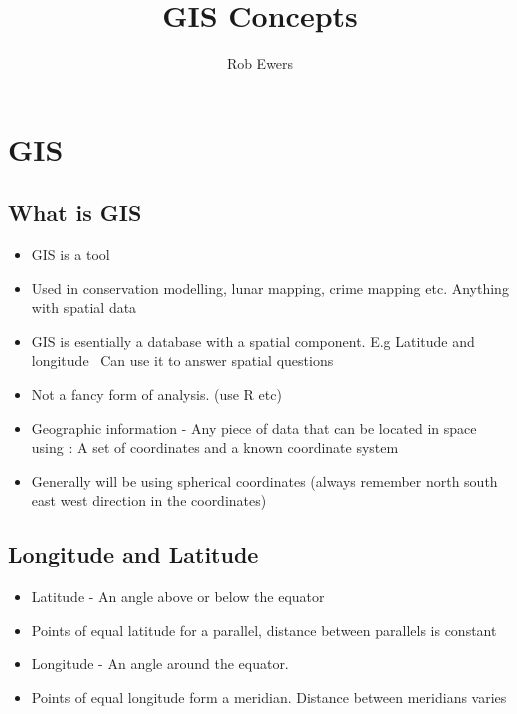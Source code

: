 \documentclass[11pt]{article}
\begin{document}
\title{GIS Concepts}
\author{Rob Ewers}
\maketitle

\section{GIS}
\subsection{What is GIS}
\begin{itemize}
\item GIS is a tool
\item Used in conservation modelling, lunar mapping, crime mapping etc. Anything with spatial data
\item GIS is esentially a database with a spatial component. E.g Latitude and longitude
\ Can use it to answer spatial questions
\item Not a fancy form of analysis. (use R etc)
\item Geographic information - Any piece of data that can be located in space using : A set of coordinates and a known coordinate system
\item Generally will be using spherical coordinates (always remember north south east west direction in the coordinates)
\end{itemize}
\subsection{Longitude and Latitude}
\begin{itemize}
\item Latitude - An angle above or below the equator
\item Points of equal latitude for a parallel, distance between parallels is constant
\item Longitude - An angle around the equator.
\item Points of equal longitude form a meridian. Distance between meridians varies

\end{itemize}
\end{document}
